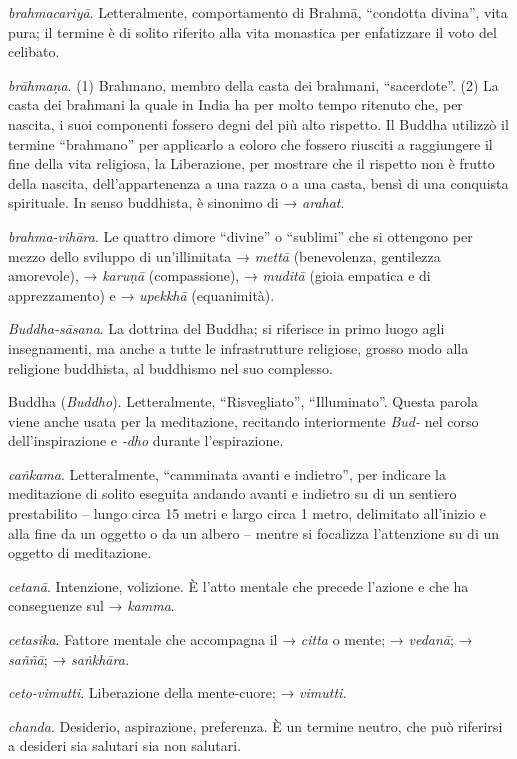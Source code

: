 \emph{brahmacariyā}. Letteralmente, comportamento di Brahmā, ``condotta
divina'', vita pura; il termine è di solito riferito alla vita monastica
per enfatizzare il voto del celibato.

\emph{brāhmaṇa}. (1) Brahmano, membro della casta dei brahmani,
``sacerdote''. (2) La casta dei brahmani la quale in India ha per molto
tempo ritenuto che, per nascita, i suoi componenti fossero degni del più
alto rispetto. Il Buddha utilizzò il termine ``brahmano'' per applicarlo
a coloro che fossero riusciti a raggiungere il fine della vita
religiosa, la Liberazione, per mostrare che il rispetto non è frutto
della nascita, dell'appartenenza a una razza o a una casta, bensì di una
conquista spirituale. In senso buddhista, è sinonimo di → \emph{arahat}.

\emph{brahma-vihāra}. Le quattro dimore ``divine'' o ``sublimi'' che si
ottengono per mezzo dello sviluppo di un'illimitata → \emph{mettā}
(benevolenza, gentilezza amorevole), → \emph{karuṇā} (compassione), →
\emph{muditā} (gioia empatica e di apprezzamento) e → \emph{upekkhā}
(equanimità).

\emph{Buddha-sāsana}. La dottrina del Buddha; si riferisce in primo
luogo agli insegnamenti, ma anche a tutte le infrastrutture religiose,
grosso modo alla religione buddhista, al buddhismo nel suo complesso.

Buddha (\emph{Buddho}). Letteralmente, ``Risvegliato'', ``Illuminato''.
Questa parola viene anche usata per la meditazione, recitando
interiormente \emph{Bud-} nel corso dell'inspirazione e \emph{-dho}
durante l'espirazione.

\emph{caṅkama}. Letteralmente, ``camminata avanti e indietro'', per
indicare la meditazione di solito eseguita andando avanti e indietro su
di un sentiero prestabilito -- lungo circa 15 metri e largo circa 1
metro, delimitato all'inizio e alla fine da un oggetto o da un albero --
mentre si focalizza l'attenzione su di un oggetto di meditazione.

\emph{cetanā}. Intenzione, volizione. È l'atto mentale che precede
l'azione e che ha conseguenze sul → \emph{kamma}.

\emph{cetasika}. Fattore mentale che accompagna il → \emph{citta} o
mente; → \emph{vedanā}; → \emph{saññā}; → \emph{saṅkhāra.}

\emph{ceto-vimutti}. Liberazione della mente-cuore; → \emph{vimutti.}

\emph{chanda}. Desiderio, aspirazione, preferenza. È un termine neutro,
che può riferirsi a desideri sia salutari sia non salutari.

